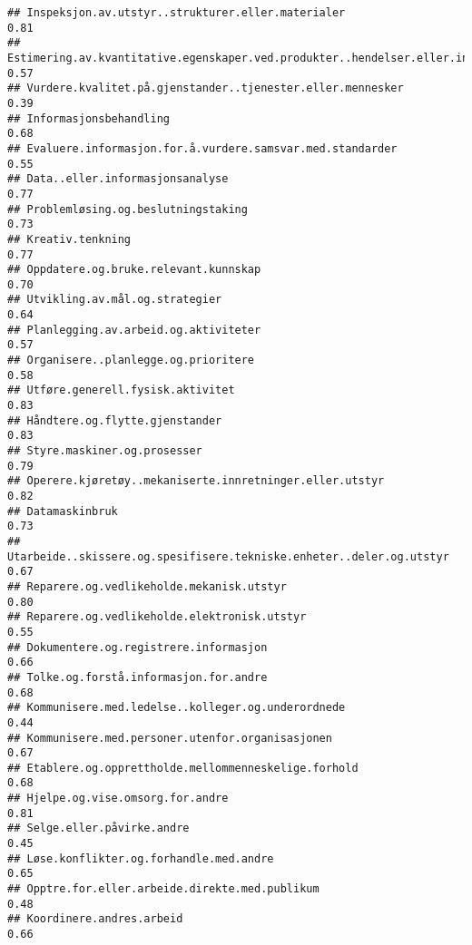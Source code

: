 \documentclass[
]{article}
\begin{document}
\begin{verbatim}
## Inspeksjon.av.utstyr..strukturer.eller.materialer                                0.81
## Estimering.av.kvantitative.egenskaper.ved.produkter..hendelser.eller.informasjon 0.57
## Vurdere.kvalitet.på.gjenstander..tjenester.eller.mennesker                       0.39
## Informasjonsbehandling                                                           0.68
## Evaluere.informasjon.for.å.vurdere.samsvar.med.standarder                        0.55
## Data..eller.informasjonsanalyse                                                  0.77
## Problemløsing.og.beslutningstaking                                               0.73
## Kreativ.tenkning                                                                 0.77
## Oppdatere.og.bruke.relevant.kunnskap                                             0.70
## Utvikling.av.mål.og.strategier                                                   0.64
## Planlegging.av.arbeid.og.aktiviteter                                             0.57
## Organisere..planlegge.og.prioritere                                              0.58
## Utføre.generell.fysisk.aktivitet                                                 0.83
## Håndtere.og.flytte.gjenstander                                                   0.83
## Styre.maskiner.og.prosesser                                                      0.79
## Operere.kjøretøy..mekaniserte.innretninger.eller.utstyr                          0.82
## Datamaskinbruk                                                                   0.73
## Utarbeide..skissere.og.spesifisere.tekniske.enheter..deler.og.utstyr             0.67
## Reparere.og.vedlikeholde.mekanisk.utstyr                                         0.80
## Reparere.og.vedlikeholde.elektronisk.utstyr                                      0.55
## Dokumentere.og.registrere.informasjon                                            0.66
## Tolke.og.forstå.informasjon.for.andre                                            0.68
## Kommunisere.med.ledelse..kolleger.og.underordnede                                0.44
## Kommunisere.med.personer.utenfor.organisasjonen                                  0.67
## Etablere.og.opprettholde.mellommenneskelige.forhold                              0.68
## Hjelpe.og.vise.omsorg.for.andre                                                  0.81
## Selge.eller.påvirke.andre                                                        0.45
## Løse.konflikter.og.forhandle.med.andre                                           0.65
## Opptre.for.eller.arbeide.direkte.med.publikum                                    0.48
## Koordinere.andres.arbeid                                                         0.66

\end{verbatim}
\end{document}
